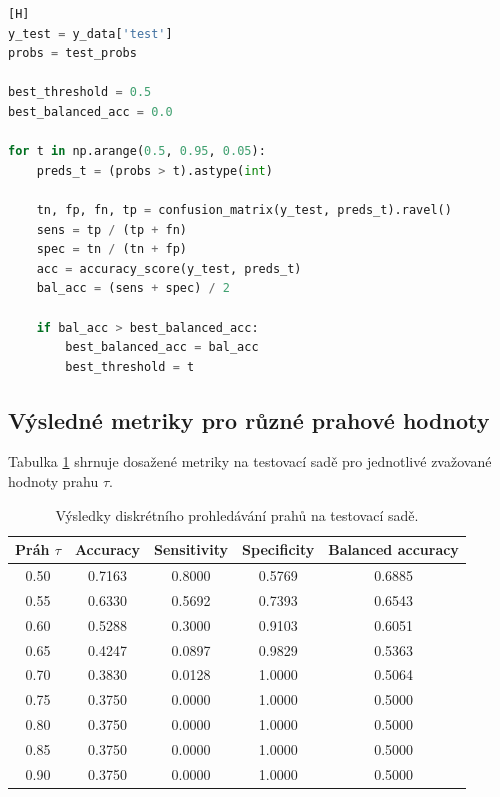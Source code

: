 \documentclass[12pt, a4paper]{report}
\begin{document}
\begin{lstlisting}[language=Python, caption={Diskrétní optimalizace prahu podle balanced accuracy.}][H]
y_test = y_data['test']
probs = test_probs

best_threshold = 0.5
best_balanced_acc = 0.0

for t in np.arange(0.5, 0.95, 0.05):
    preds_t = (probs > t).astype(int)
    
    tn, fp, fn, tp = confusion_matrix(y_test, preds_t).ravel()
    sens = tp / (tp + fn)
    spec = tn / (tn + fp)
    acc = accuracy_score(y_test, preds_t)
    bal_acc = (sens + spec) / 2
    
    if bal_acc > best_balanced_acc:
        best_balanced_acc = bal_acc
        best_threshold = t
\end{lstlisting}

\subsection{Výsledné metriky pro různé prahové hodnoty}

Tabulka \ref{tab:threshold_scan} shrnuje dosažené metriky na testovací sadě
pro jednotlivé zvažované hodnoty prahu \(\tau\). 

\begin{table}[H]
    \centering
    \caption{Výsledky diskrétního prohledávání prahů na testovací sadě.}
    \label{tab:threshold_scan}
    \begin{tabular}{|c|c|c|c|c|}
        \hline
        \textbf{Práh \(\tau\)} & \textbf{Accuracy} & \textbf{Sensitivity} &
        \textbf{Specificity} & \textbf{Balanced accuracy} \\
        \hline
        0.50 & 0.7163 & 0.8000 & 0.5769 & 0.6885 \\
        0.55 & 0.6330 & 0.5692 & 0.7393 & 0.6543 \\
        0.60 & 0.5288 & 0.3000 & 0.9103 & 0.6051 \\
        0.65 & 0.4247 & 0.0897 & 0.9829 & 0.5363 \\
        0.70 & 0.3830 & 0.0128 & 1.0000 & 0.5064 \\
        0.75 & 0.3750 & 0.0000 & 1.0000 & 0.5000 \\
        0.80 & 0.3750 & 0.0000 & 1.0000 & 0.5000 \\
        0.85 & 0.3750 & 0.0000 & 1.0000 & 0.5000 \\
        0.90 & 0.3750 & 0.0000 & 1.0000 & 0.5000 \\
        \hline
    \end{tabular}
\end{table}
\end{document}
